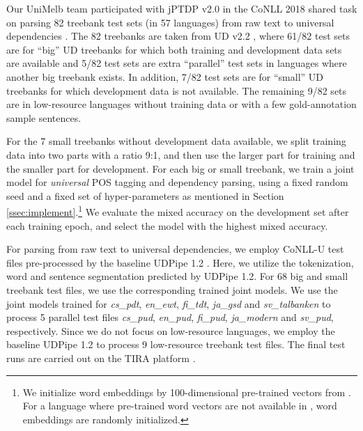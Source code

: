 \documentclass[11pt,letterpaper]{article}
\begin{document}
Our  UniMelb team participated with  jPTDP v2.0 in the CoNLL 2018 shared task   on parsing 82 treebank test sets (in 57 languages) from raw text to universal dependencies \citep{udst:overview}. The 82 treebanks are taken from  UD  v2.2 \citep{11234/1-2837}, where 61/82 test sets are for  ``big'' UD treebanks  for which both training and development data sets are available and 5/82 test sets are extra ``parallel''  test sets in languages where another big treebank exists. In addition, 7/82 test sets are for  ``small'' UD treebanks for which development data is not available. The remaining 9/82 sets  are in low-resource languages without training data or with a few gold-annotation sample sentences. 

For the 7 small treebanks without development data available, we  split training data into two parts with a ratio 9:1, and then use the larger part for training and the smaller part for development.  For each big or small treebank, we train a joint model for \textit{universal} POS tagging and dependency parsing, using a fixed random seed and a fixed set of hyper-parameters as mentioned in Section \ref{ssec:implement}.\footnote{We initialize word embeddings by 100-dimensional pre-trained  vectors from \citet{11234/1-1989}. For a language where pre-trained word vectors are not available in \citet{11234/1-1989}, word embeddings  are randomly initialized.} 
We evaluate the mixed accuracy on the development set after each training epoch, and select the model with the highest mixed accuracy.  


For parsing from raw text to universal dependencies, we employ  CoNLL-U test files pre-processed by the baseline UDPipe 1.2 \citep{udpipe:2017}. Here, 
we utilize the tokenization, word and sentence segmentation  predicted by  UDPipe 1.2.   For 68 big and small treebank test files, we use the corresponding  trained joint models. We use the joint models trained for \textit{cs\_pdt}, \textit{en\_ewt}, \textit{fi\_tdt}, \textit{ja\_gsd} and \textit{sv\_talbanken} to process 5 parallel test files  \textit{cs\_pud}, \textit{en\_pud}, \textit{fi\_pud}, \textit{ja\_modern} and \textit{sv\_pud}, respectively. Since we do not focus on low-resource languages, we employ  the baseline UDPipe 1.2 to process 9 low-resource treebank test files. The final test runs are carried out on the TIRA  platform \citep{tira}. 
\end{document}
